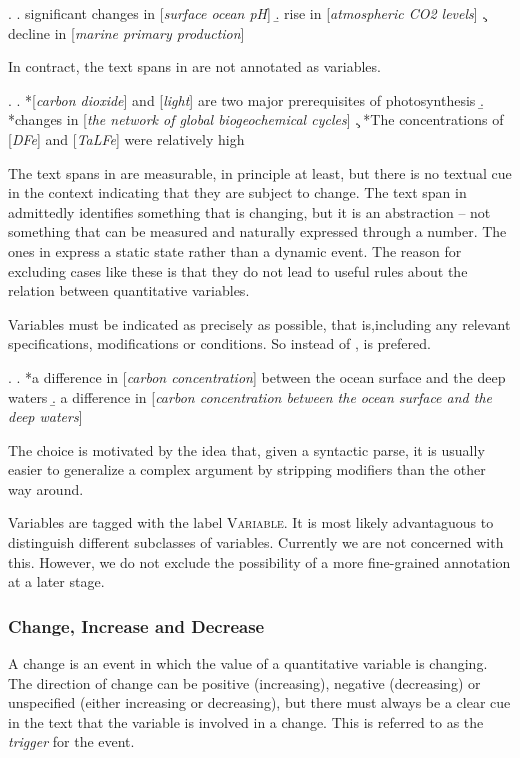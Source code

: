 \documentclass[10pt, a4paper]{article}
\newcommand{\tag}[1]{\textsc{#1}}
\begin{document}
\ex.
  \a. significant changes in [\emph{surface ocean pH}]
  \b. rise in [\emph{atmospheric CO2 levels}]
  \c. decline in [\emph{marine primary production}]

In contract, the text spans in \Next are not annotated as variables.

\ex.
  \a. *[\emph{carbon dioxide}] and [\emph{light}] are two major prerequisites of photosynthesis
  \b. *changes in [\emph{the network of global biogeochemical cycles}] 
  \c. *The concentrations of [\emph{DFe}] and [\emph{TaLFe}] were relatively high

The text spans in \Last[a] are measurable, in principle at least, but there is no textual cue in the context indicating that they are subject to change. 
The text span in \Last[b] admittedly identifies something that is changing, but it is an abstraction -- not something that can be measured and naturally expressed through a number. 
The ones in \Last[c] express a static state rather than a dynamic event.
The reason for excluding cases like these is that they do not lead to useful rules about the relation between quantitative variables.

Variables must be indicated as precisely as possible, that is,including any relevant specifications, modifications or conditions. So instead of \Next[a], \Next[b] is prefered.

\ex.
  \a. *a difference in [\emph{carbon concentration}] between the ocean surface and the deep waters
  \b. a difference in [\emph{carbon concentration between the ocean surface and the deep waters}]

The choice is motivated by the idea that, given a syntactic parse, it is usually easier to generalize a complex argument by stripping modifiers than the other way around.  

Variables are tagged with the label \tag{Variable}. It is most likely advantaguous to distinguish different subclasses of variables. Currently we are not concerned with this. 
However, we do not exclude the possibility of a more fine-grained annotation at a later stage. 


\subsubsection{Change, Increase and Decrease}

A change is an event in which the value of a quantitative variable is changing.
The direction of change can be positive (increasing), negative (decreasing) or unspecified (either increasing or decreasing), but there must always be a clear cue in the text that the variable is involved in a change.
This is referred to as the \emph{trigger} for the event.
\end{document}

